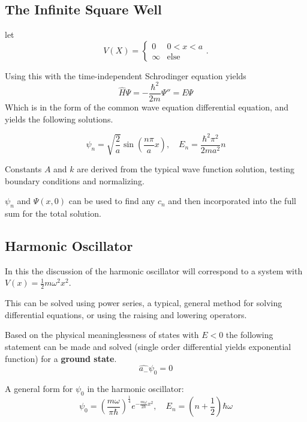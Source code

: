 \subsection{The Infinite Square Well}

let
\[
V(X) =
\begin{cases}
  0 & 0<x<a\\
  \infty & \text{else}
\end{cases}.\] 

Using this with the time-independent Schrodinger equation yields
\begin{equation}
  \hat{H}\Psi=-\frac{\hbar^2}{2m}\Psi''=E\Psi
\end{equation}
Which is in the form of the common wave equation differential equation, and yields the following solutions. 

\begin{equation}
  \psi_n=\sqrt{\frac{2}{a}}\sin(\frac{n \pi}{a}x),\quad E_{n}=\frac{\hbar^2 \pi^2}{2ma^2}n
\end{equation}

Constants $ A $ and $ k $ are derived from the typical wave function solution, testing boundary conditions and normalizing.


$ \psi_{n} $ and $ \Psi(x,0) $ can be used to find any $ c_{n} $ and then incorporated into the full sum for the total solution.




\subsection{Harmonic Oscillator}
In this the discussion of the harmonic oscillator will correspond to a system with $ V(x)=\frac{1}{2}m\omega^2 x^2 $. 

This can be solved using power series, a typical, general method for solving differential equations, or using the raising and lowering operators.

Based on the physical meaninglessness of states with $ E<0 $ the following statement can be made and solved (single order differential yields exponential function) for a \textbf{ground state}.
\begin{equation}
  \hat{a_{-}}\psi_0=0
\end{equation}

  A general form for $ \psi_0 $ in the harmonic oscillator: 
\begin{equation}
  \psi_0=(\frac{m\omega}{\pi\hbar})^{\frac{1}{4}}e^{- \frac{m\omega}{2\hbar}x^2},\quad E_{n}=(n+\frac{1}{2})\hbar \omega
\end{equation}

